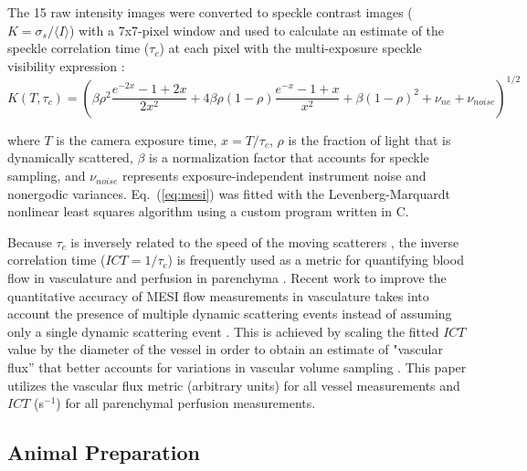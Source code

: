 \documentclass[12pt]{spieman}
\begin{document}
\begin{spacing}{2}
The 15 raw intensity images were converted to speckle contrast images ($K = \sigma_{s} / {\langle{I}\rangle}$) with a 7x7-pixel window and used to calculate an estimate of the speckle correlation time ($\tau_c$) at each pixel with the multi-exposure speckle visibility expression \cite{Parthasarathy:2008el}:
%
\begin{equation}
    \label{eq:mesi}
    K(T,\tau_c) =
        \left(
        \beta\rho^2\frac{e^{-2x} - 1 + 2x}{2x^2} +
        4\beta\rho(1 - \rho)\frac{e^{-x} - 1 + x}{x^2} +
        \beta(1 - \rho)^2 +
        \nu_{ne} +
        \nu_{noise}
        \right)^{1/2}
\end{equation}

\noindent where $T$ is the camera exposure time, $x = T/\tau_c$, $\rho$ is the fraction of light that is dynamically scattered, $\beta$ is a normalization factor that accounts for speckle sampling, and $\nu_{noise}$ represents exposure-independent instrument noise and nonergodic variances. Eq.~(\ref{eq:mesi}) was fitted with the Levenberg-Marquardt nonlinear least squares algorithm \cite{Lourakis:2005} using a custom program written in C.

Because $\tau_c$ is inversely related to the speed of the moving scatterers \cite{Bonner:1981hg,Briers:1996kfa}, the inverse correlation time ($ICT = 1/\tau_c$) is frequently used as a metric for quantifying blood flow in vasculature and perfusion in parenchyma \cite{Ayata:2004ba,Strong:2005kj,Sullender:2018ff}. Recent work to improve the quantitative accuracy of MESI flow measurements in vasculature takes into account the presence of multiple dynamic scattering events instead of assuming only a single dynamic scattering event \cite{Kazmi:2015du}. This is achieved by scaling the fitted $ICT$ value by the diameter of the vessel in order to obtain an estimate of "vascular flux” that better accounts for variations in vascular volume sampling \cite{Kazmi:2015du,Richards:2017df}. This paper utilizes the vascular flux metric (arbitrary units) for all vessel measurements and $ICT$ (s$^{-1}$) for all parenchymal perfusion measurements.



\subsection{Animal Preparation}


\end{spacing}
\end{document}
